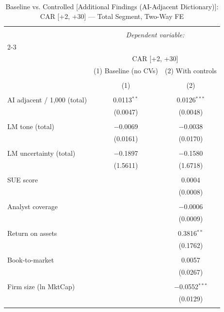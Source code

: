 
\begin{table}[!htbp] \centering 
  \caption{Baseline vs. Controlled [Additional Findings (AI-Adjacent Dictionary)]: CAR [+2, +30] — Total Segment, Two-Way FE} 
  \label{} 
\begin{tabular}{@{\extracolsep{5pt}}lcc} 
\\[-1.8ex]\hline 
\hline \\[-1.8ex] 
 & \multicolumn{2}{c}{\textit{Dependent variable:}} \\ 
\cline{2-3} 
\\[-1.8ex] & \multicolumn{2}{c}{CAR [+2, +30]} \\ 
 & (1) Baseline (no CVs) & (2) With controls \\ 
\\[-1.8ex] & (1) & (2)\\ 
\hline \\[-1.8ex] 
 AI adjacent / 1,000 (total) & 0.0113$^{**}$ & 0.0126$^{***}$ \\ 
  & (0.0047) & (0.0048) \\ 
  & & \\ 
 LM tone (total) & $-$0.0069 & $-$0.0038 \\ 
  & (0.0161) & (0.0170) \\ 
  & & \\ 
 LM uncertainty (total) & $-$0.1897 & $-$0.1580 \\ 
  & (1.5611) & (1.6718) \\ 
  & & \\ 
 SUE score &  & 0.0004 \\ 
  &  & (0.0008) \\ 
  & & \\ 
 Analyst coverage &  & $-$0.0006 \\ 
  &  & (0.0009) \\ 
  & & \\ 
 Return on assets &  & 0.3816$^{**}$ \\ 
  &  & (0.1762) \\ 
  & & \\ 
 Book-to-market &  & 0.0057 \\ 
  &  & (0.0267) \\ 
  & & \\ 
 Firm size (ln MktCap) &  & $-$0.0552$^{***}$ \\ 
  &  & (0.0129) \\ 
  & & \\ 

\end{tabular}
\end{table}
